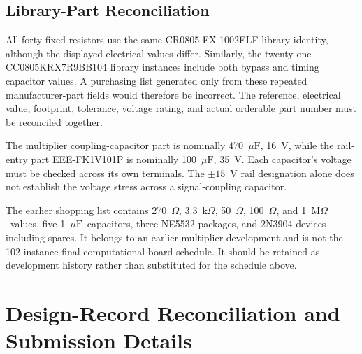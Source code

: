 \documentclass[11pt,a4paper]{article}
\newcommand{\ohm}{\ensuremath{\Omega}}
\newcommand{\kohm}{\ensuremath{\mathrm{k}\Omega}}
\newcommand{\uF}{\ensuremath{\mu\mathrm{F}}}
\begin{document}
\subsection{Library-Part Reconciliation}
All forty fixed resistors use the same CR0805-FX-1002ELF library identity, although the displayed electrical values differ. Similarly, the twenty-one CC0805KRX7R9BB104 library instances include both bypass and timing capacitor values. A purchasing list generated only from these repeated manufacturer-part fields would therefore be incorrect. The reference, electrical value, footprint, tolerance, voltage rating, and actual orderable part number must be reconciled together.

The multiplier coupling-capacitor part is nominally 470~\uF, 16~V, while the rail-entry part EEE-FK1V101P is nominally 100~\uF, 35~V. Each capacitor's voltage must be checked across its own terminals. The $\pm15$~V rail designation alone does not establish the voltage stress across a signal-coupling capacitor.

The earlier shopping list contains 270~\ohm, 3.3~\kohm, 50~\ohm, 100~\ohm, and 1~M\ohm\ values, five 1~\uF\ capacitors, three NE5532 packages, and 2N3904 devices including spares. It belongs to an earlier multiplier development and is not the 102-instance final computational-board schedule. It should be retained as development history rather than substituted for the schedule above.

\clearpage
\section{Design-Record Reconciliation and Submission Details}
\label{app:reconcile}
\end{document}

